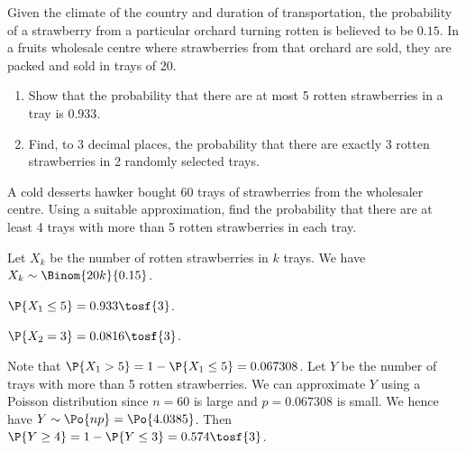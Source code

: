 \begin{problem}
    Given the climate of the country and duration of transportation, the probability of a strawberry from a particular orchard turning rotten is believed to be $0.15$. In a fruits wholesale centre where strawberries from that orchard are sold, they are packed and sold in trays of 20.

    \begin{enumerate}
        \item Show that the probability that there are at most 5 rotten strawberries in a tray is $0.933$.
        \item Find, to 3 decimal places, the probability that there are exactly 3 rotten strawberries in 2 randomly selected trays.
    \end{enumerate}
    
    A cold desserts hawker bought 60 trays of strawberries from the wholesaler centre. Using a suitable approximation, find the probability that there are at least 4 trays with more than 5 rotten strawberries in each tray.
\end{problem}
\begin{solution}
    Let $X_k$ be the number of rotten strawberries in $k$ trays. We have $X_k \sim \Binom{20k}{0.15}$.
    \begin{ppart}
        $\P{X_1 \leq 5} = 0.933 \tosf{3}$.
    \end{ppart}
    \begin{ppart}
        $\P{X_2 = 3} = 0.0816 \tosf{3}$.
    \end{ppart}

    Note that $\P{X_1 > 5} = 1 - \P{X_1 \leq 5} = 0.067308$. Let $Y$ be the number of trays with more than 5 rotten strawberries. We can approximate $Y$ using a Poisson distribution since $n = 60$ is large and $p = 0.067308$ is small. We hence have $Y \sim \Po{np} = \Po{4.0385}$. Then $\P{Y \geq 4} = 1 - \P{Y \leq 3} = 0.574 \tosf{3}$.
\end{solution}